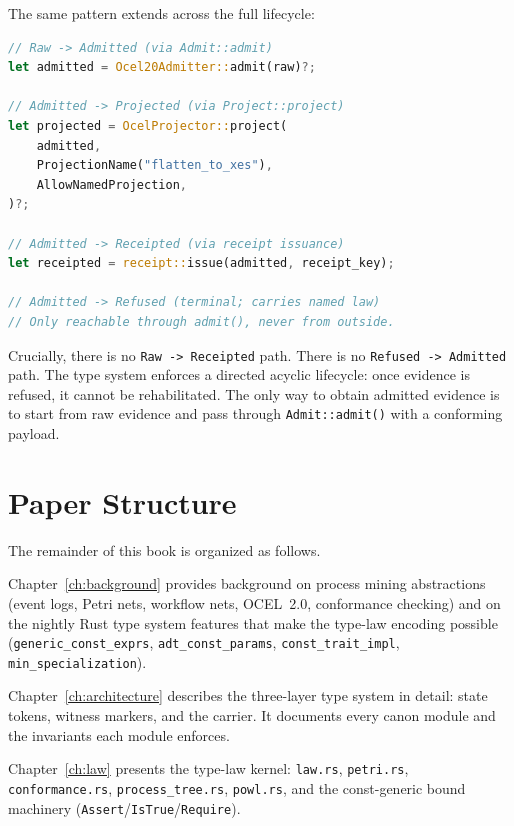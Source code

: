 The same pattern extends across the full lifecycle:

\begin{lstlisting}[language=Rust, caption={Full lifecycle from \texttt{Raw} to
  \texttt{Receipted}. Each arrow is a type transition. None can be reversed or
  skipped without a compiler error.}, label={lst:intro-full-lifecycle}]
// Raw -> Admitted (via Admit::admit)
let admitted = Ocel20Admitter::admit(raw)?;

// Admitted -> Projected (via Project::project)
let projected = OcelProjector::project(
    admitted,
    ProjectionName("flatten_to_xes"),
    AllowNamedProjection,
)?;

// Admitted -> Receipted (via receipt issuance)
let receipted = receipt::issue(admitted, receipt_key);

// Admitted -> Refused (terminal; carries named law)
// Only reachable through admit(), never from outside.
\end{lstlisting}

Crucially, there is no \texttt{Raw -> Receipted} path. There is no
\texttt{Refused -> Admitted} path. The type system enforces a
directed acyclic lifecycle: once evidence is refused, it cannot be
rehabilitated. The only way to obtain admitted evidence is to start from raw
evidence and pass through \texttt{Admit::admit()} with a conforming payload.

\section{Paper Structure}
\label{sec:intro-structure}

The remainder of this book is organized as follows.

Chapter~\ref{ch:background} provides background on process mining abstractions
(event logs, Petri nets, workflow nets, OCEL~2.0, conformance checking) and on
the nightly Rust type system features that make the type-law encoding possible
(\texttt{generic\_const\_exprs}, \texttt{adt\_const\_params},
\texttt{const\_trait\_impl}, \texttt{min\_specialization}).

Chapter~\ref{ch:architecture} describes the three-layer type system in detail:
state tokens, witness markers, and the \Evidence{}{}{} carrier. It documents
every canon module and the invariants each module enforces.

Chapter~\ref{ch:law} presents the type-law kernel: \texttt{law.rs},
\texttt{petri.rs}, \texttt{conformance.rs}, \texttt{process\_tree.rs},
\texttt{powl.rs}, and the const-generic bound machinery
(\texttt{Assert}/\texttt{IsTrue}/\texttt{Require}).

